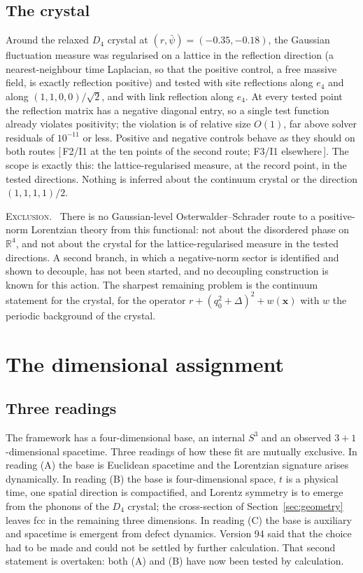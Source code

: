 \documentclass[a4paper,11pt]{article}
\makeatletter
\numberwithin{equation}{section}
\theoremstyle{jsplain}
\theoremstyle{jsrem}
\newcommand{\lbl}[1]{\textcolor{lbl@#1}{\textsc{#1}}.\ }
\newcommand{\grade}[1]{[\,#1\,]}
\makeatother
\begin{document}
\subsection{The crystal}

Around the relaxed $D_4$ crystal at $(r,\bar\psi)=(-0.35,-0.18)$, the Gaussian fluctuation measure was regularised on a lattice in the reflection direction (a nearest-neighbour time Laplacian, so that the positive control, a free massive field, is exactly reflection positive) and tested with site reflections along $e_4$ and along $(1,1,0,0)/\sqrt2$, and with link reflection along $e_4$. At every tested point the reflection matrix has a negative diagonal entry, so a single test function already violates positivity; the violation is of relative size $O(1)$, far above solver residuals of $10^{-11}$ or less. Positive and negative controls behave as they should on both routes \grade{F2/I1 at the ten points of the second route; F3/I1 elsewhere}. The scope is exactly this: the lattice-regularised measure, at the record point, in the tested directions. Nothing is inferred about the continuum crystal or the direction $(1,1,1,1)/2$.

\lbl{Exclusion} There is no Gaussian-level Osterwalder--Schrader route to a positive-norm Lorentzian theory from this functional: not about the disordered phase on $\mathbb{R}^4$, and not about the crystal for the lattice-regularised measure in the tested directions. A second branch, in which a negative-norm sector is identified and shown to decouple, has not been started, and no decoupling construction is known for this action. The sharpest remaining problem is the continuum statement for the crystal, for the operator $r+(q_0^2+\Delta)^2+w(\mathbf{x})$ with $w$ the periodic background of the crystal.

\section{The dimensional assignment}\label{sec:dimension}

\subsection{Three readings}

The framework has a four-dimensional base, an internal $S^3$ and an observed $3+1$-dimensional spacetime. Three readings of how these fit are mutually exclusive. In reading (A) the base is Euclidean spacetime and the Lorentzian signature arises dynamically. In reading (B) the base is four-dimensional space, $t$ is a physical time, one spatial direction is compactified, and Lorentz symmetry is to emerge from the phonons of the $D_4$ crystal; the cross-section of Section~\ref{sec:geometry} leaves fcc in the remaining three dimensions. In reading (C) the base is auxiliary and spacetime is emergent from defect dynamics. Version 94 said that the choice had to be made and could not be settled by further calculation. That second statement is overtaken: both (A) and (B) have now been tested by calculation.
\end{document}
